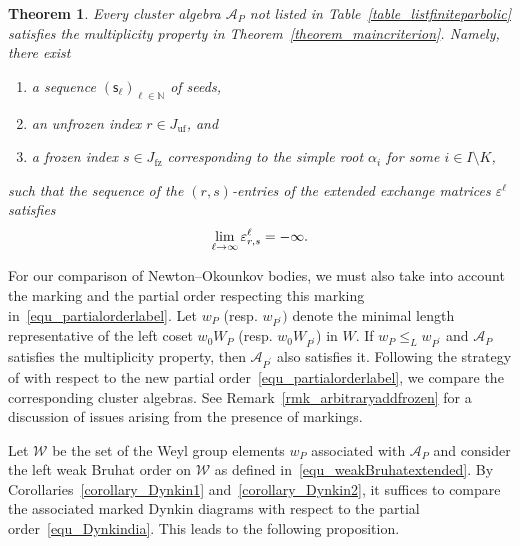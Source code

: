 \documentclass[11pt]{amsart}
\def\mcal{\mathcal}
\numberwithin{equation}{section}
\theoremstyle{plain}
\newtheorem{theorem}{Theorem}[section]
\theoremstyle{definition}
\def\to{\mathchoice{\longrightarrow}{\rightarrow}{\rightarrow}{\rightarrow}}
\numberwithin{equation}{section}
\newcommand{\seed}{\mathsf{s}}
\begin{document}
\begin{theorem}\label{theorem_divergeentries}
Every cluster algebra $\mcal{A}_P$ not listed in Table~\ref{table_listfiniteparbolic} satisfies the multiplicity property in Theorem~\ref{theorem_maincriterion}. Namely, there exist 
\begin{enumerate}
\item a sequence $\left( \seed_\ell \right)_{\ell \in \mathbb{N}}$ of seeds, 
\item an unfrozen index $r \in J_\mathrm{uf}$, and 
\item a frozen index $s \in J_\mathrm{fz}$ corresponding to the simple root $\alpha_i$ for some $i \in I \setminus K$, 
\end{enumerate}
such that the sequence of the $(r, s)$-entries of the extended exchange matrices $\varepsilon^\ell$ satisfies
$$
\lim_{\ell \to \infty} \varepsilon^\ell_{r, s} = - \infty.
$$
\end{theorem}

For our comparison of Newton--Okounkov bodies, we must also take into account the marking and the  partial order respecting this marking in~\eqref{equ_partialorderlabel}. Let $w_P$ (resp. $w_{P^\prime})$ denote the minimal length representative of the left coset $w_0 W_P$ (resp. $w_0 W_{P^\prime}$) in $W$. If $w_P \leq_L w_{P^\prime}$ and $\mcal{A}_P$ satisfies the multiplicity property, then $\mcal{A}_{P^\prime}$ also satisfies it. Following the strategy of \cite{GLS08} with respect to the new partial order~\eqref{equ_partialorderlabel}, we compare the corresponding cluster algebras. See Remark~\ref{rmk_arbitraryaddfrozen} for a discussion of issues arising from the presence of markings.

Let $\mathcal{W}$ be the set of the Weyl group elements $w_P$ associated with $\mcal{A}_P$ and consider the left weak Bruhat order on $\mathcal{W}$ as defined in~\eqref{equ_weakBruhatextended}. By Corollaries~\ref{corollary_Dynkin1} and~\ref{corollary_Dynkin2}, it suffices to compare the associated marked Dynkin diagrams with respect to the partial order~\eqref{equ_Dynkindia}. This leads to the following proposition.
\end{document}
